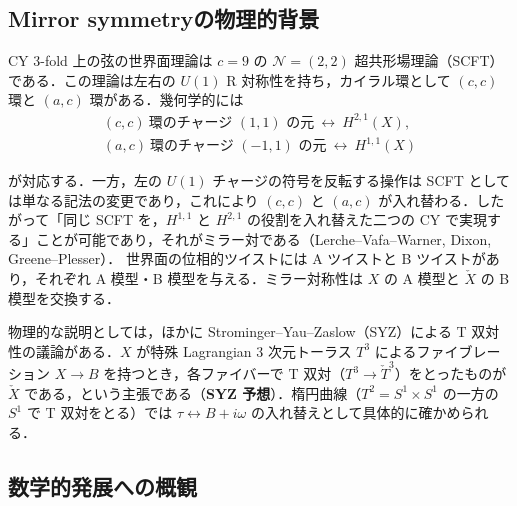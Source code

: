 \subsection{Mirror symmetryの物理的背景}

\begin{physbox}[$\mathcal{N}=(2,2)$ 超共形場理論]
CY 3-fold 上の弦の世界面理論は $c=9$ の $\mathcal{N}=(2,2)$ 超共形場理論（SCFT）である．この理論は左右の $U(1)$ R 対称性を持ち，カイラル環として $(c,c)$ 環と $(a,c)$ 環がある．幾何学的には
\begin{gather*}
(c,c)\ \text{環のチャージ } (1,1) \text{ の元}\ \leftrightarrow\ H^{2,1}(X),\\
(a,c)\ \text{環のチャージ } (-1,1) \text{ の元}\ \leftrightarrow\ H^{1,1}(X)
\end{gather*}

が対応する．一方，左の $U(1)$ チャージの符号を反転する操作は SCFT としては単なる記法の変更であり，これにより $(c,c)$ と $(a,c)$ が入れ替わる．したがって「同じ SCFT を，$H^{1,1}$ と $H^{2,1}$ の役割を入れ替えた二つの CY で実現する」ことが可能であり，それがミラー対である（Lerche--Vafa--Warner, Dixon, Greene--Plesser）．
世界面の位相的ツイストには A ツイストと B ツイストがあり，それぞれ A 模型・B 模型を与える．ミラー対称性は $X$ の A 模型と $\check X$ の B 模型を交換する．
\end{physbox}

物理的な説明としては，ほかに Strominger--Yau--Zaslow（SYZ）による T 双対性の議論がある．$X$ が特殊 Lagrangian 3 次元トーラス $T^3$ によるファイブレーション $X\to B$ を持つとき，各ファイバーで T 双対（$T^3\to\check T^3$）をとったものが $\check X$ である，という主張である（\textbf{SYZ 予想}）．楕円曲線（$T^2=S^1\times S^1$ の一方の $S^1$ で T 双対をとる）では $\tau\leftrightarrow B+i\omega$ の入れ替えとして具体的に確かめられる．

\subsection{数学的発展への概観}

